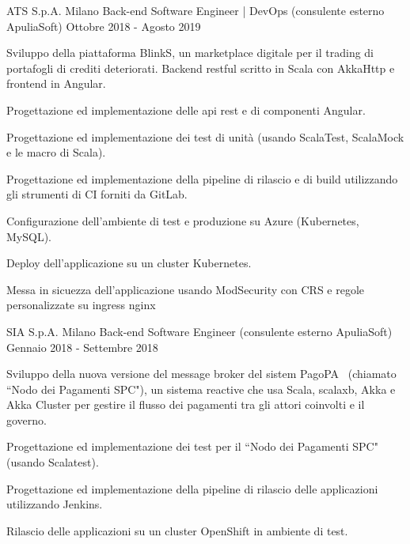 \documentclass{resume} %
\begin{document}
\cvEntry
  {ATS S.p.A.}
  {Milano}
  {Back-end Software Engineer | DevOps (consulente esterno ApuliaSoft)}
  {Ottobre 2018 - Agosto 2019}{
    \begin{cvEntryItems}
      \item Sviluppo della piattaforma BlinkS, un marketplace digitale per il trading di
            portafogli di crediti deteriorati. Backend restful scritto in Scala con AkkaHttp
            e frontend in Angular.
      \item Progettazione ed implementazione delle api rest e di componenti Angular.
      \item Progettazione ed implementazione dei test di unit\`a (usando ScalaTest, ScalaMock
            e le macro di Scala).
      \item Progettazione ed implementazione della pipeline di rilascio e di build utilizzando
            gli strumenti di CI forniti da GitLab.
      \item Configurazione dell'ambiente di test e produzione su Azure (Kubernetes, MySQL).
      \item Deploy dell'applicazione su un cluster Kubernetes.
      \item Messa in sicuezza dell'applicazione usando ModSecurity con CRS e regole personalizzate
            su ingress nginx
    \end{cvEntryItems}
}


\cvEntry
  {SIA S.p.A.}
  {Milano}
  {Back-end Software Engineer (consulente esterno ApuliaSoft)}
  {Gennaio 2018 - Settembre 2018}{
    \begin{cvEntryItems}
      \item Sviluppo della nuova versione del message broker del sistem PagoPA\textregistered~
            (chiamato ``Nodo dei Pagamenti SPC"), un sistema reactive che usa Scala, scalaxb,
            Akka e Akka Cluster per gestire il flusso dei pagamenti tra gli attori coinvolti
            e il governo.
      \item Progettazione ed implementazione dei test per il ``Nodo dei Pagamenti SPC" (usando
            Scalatest).
      \item Progettazione ed implementazione della pipeline di rilascio delle applicazioni
            utilizzando Jenkins.
      \item Rilascio delle applicazioni su un cluster OpenShift in ambiente di test.
    \end{cvEntryItems}
}
\end{document}

